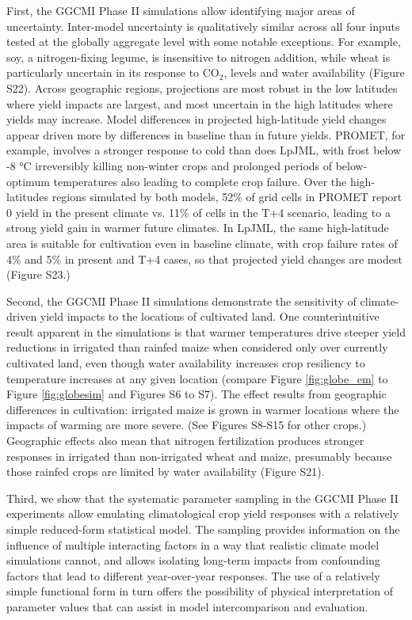\documentclass[esd, manuscript]{copernicus} %
\begin{document}
First, the GGCMI Phase II simulations allow identifying major areas of uncertainty. Inter-model uncertainty is qualitatively similar across all four inputs tested at the globally aggregate level with some notable exceptions. For example, soy, a nitrogen-fixing legume, is insensitive to nitrogen addition, while wheat is particularly uncertain in its response to CO$_2$, levels and water availability (Figure S22). Across geographic regions, projections are most robust in the low latitudes where yield impacts are largest, and most uncertain in the high latitudes where yields may increase. Model differences in projected high-latitude yield changes appear driven more by differences in baseline than in future yields.  PROMET, for example, involves a stronger response to cold than does LpJML, with frost below -8 °C irreversibly killing non-winter crops and prolonged periods of below-optimum temperatures also leading to complete crop failure. Over the high-latitudes regions simulated by both models, 52\% of grid cells in PROMET report 0 yield in the present climate vs. 11\% of cells in the T+4 scenario, leading to a strong yield gain in warmer future climates. In LpJML, the same high-latitude area is suitable for cultivation even in baseline climate, with crop failure rates of 4\% and 5\% in present and T+4 cases, so that projected yield changes are modest (Figure S23.)

Second, the GGCMI Phase II simulations demonstrate the sensitivity of climate-driven yield impacts to the locations of cultivated land. One counterintuitive result apparent in the simulations is that warmer temperatures drive steeper yield reductions in irrigated than rainfed maize when considered only over currently cultivated land, even though water availability increases crop resiliency to temperature increases at any given location (compare Figure \ref{fig:globe_em} to Figure \ref{fig:globesim} and Figures S6 to S7). The effect results from geographic differences in cultivation: irrigated maize is grown in warmer locations where the impacts of warming are more severe. (See Figures S8-S15 for other crops.) Geographic effects also mean that nitrogen fertilization produces stronger responses in irrigated than non-irrigated wheat and maize, presumably because those rainfed crops are limited by water availability (Figure S21).

Third, we show that the systematic parameter sampling in the GGCMI Phase II experiments allow emulating climatological crop yield responses with a relatively simple reduced-form statistical model. The sampling provides information on the influence of multiple interacting factors in a way that realistic climate model simulations cannot, and allows isolating long-term impacts from confounding factors that lead to different year-over-year responses. The use of a relatively simple functional form in turn offers the possibility of physical interpretation of parameter values that can assist in model intercomparison and evaluation. 
\end{document}
